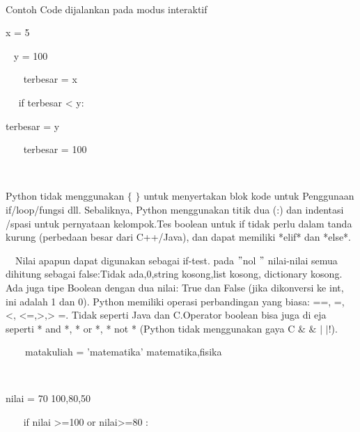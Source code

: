 \noindent 
~~~  \par
\noindent 
Contoh Code dijalankan pada modus interaktif \par
\vspace{12pt}
\noindent 
  x = 5 \par
\vspace{12pt}
\noindent 
~ y = 100 \par
\vspace{12pt}
\noindent 
~~~ terbesar = x \par
\vspace{12pt}
\noindent 
~~ if terbesar < y: \par
\vspace{12pt}
\noindent 
terbesar = y \par
\vspace{12pt}
~~~ terbesar = 100  \par
\vspace{12pt}
\noindent 
~~~  \par
\vspace{12pt}
\noindent 
 $  $Python tidak menggunakan  $  \{  $ $  \}  $ untuk menyertakan blok kode untuk Penggunaan if/loop/fungsi dll. Sebaliknya, Python menggunakan titik dua (:) dan indentasi /spasi untuk pernyataan $  $kelompok.Tes $  $boolean untuk if tidak perlu dalam tanda kurung (perbedaan besar dari C++/Java), dan dapat memiliki *elif* dan *else*. \par
\noindent 
\vspace{\baselineskip}
 $  $ $  $ $  $ $  $Nilai apapun dapat digunakan sebagai if-test. pada  $ " $nol $ " $ nilai-nilai semua dihitung sebagai false:Tidak ada,0,string kosong,list kosong, dictionary kosong. Ada juga tipe Boolean dengan dua nilai: True dan False (jika dikonversi ke int, ini adalah 1 dan 0). Python memiliki operasi perbandingan yang biasa: ==, =, <, <=,>,> =. Tidak seperti Java dan C.Operator boolean bisa juga di eja seperti * and *, * or *, * not * (Python tidak menggunakan gaya C  $  \&  $  $  \&  $  $  \vert  $  $  \vert  $!). \par
\vspace{12pt}
\noindent 
~~~~matakuliah = 'matematika'   matematika,fisika \par
\noindent 
~~  \par
\noindent 
 nilai = 70 100,80,50 \par
\vspace{12pt}
\noindent 
~~~ if nilai >=100 or nilai>=80 : \par
\vspace{12pt}
